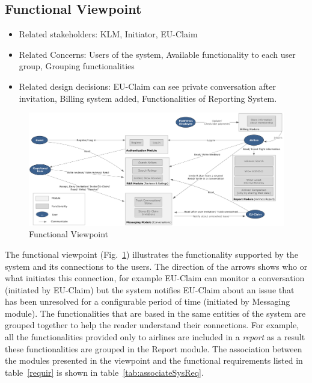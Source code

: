 % 

\subsection{Functional Viewpoint}

\begin{itemize}
\item Related stakeholders: KLM, Initiator, EU-Claim
\item Related Concerns: Users of the system, Available functionality to each user group, Grouping functionalities
\item Related design decisions: EU-Claim can see private conversation after invitation, Billing system added, Functionalities of Reporting System.
\end{itemize}

\newpage
\begin{landscape}
\begin{figure}
\includegraphics[width=600px]{Functional_Viewpoint.jpg}
\caption{Functional Viewpoint}
\label{fig:functional}
\end{figure}
\end{landscape}

The functional viewpoint (Fig.~\ref{fig:functional}) illustrates the functionality supported by the system and its connections to the users. The direction of the arrows shows who or what initiates this connection, for example EU-Claim can monitor a conversation (initiated by EU-Claim) but  the system notifies EU-Claim about an issue that has been unresolved for a configurable period of time (initiated by Messaging module). The functionalities that are based in the same entities of the system are grouped together to help the reader understand their connections. For example, all the functionalities  provided only to airlines are included in a {\em report} as a result these functionalities are grouped in the Report module. The association between the modules presented in the viewpoint and the functional requirements listed in table~\ref{requir} is shown in table~\ref{tab:associateSysReq}.


